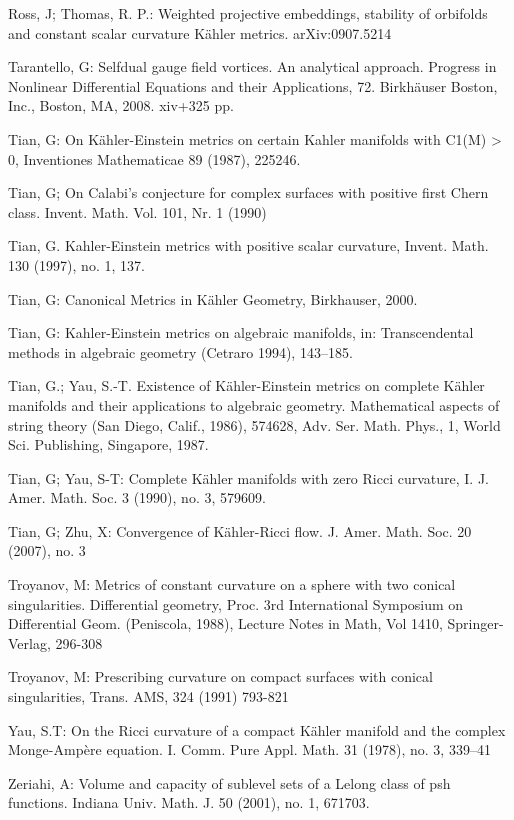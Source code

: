 \documentclass[11pt,oneside,english]{amsart}
\numberwithin{equation}{section}
\numberwithin{figure}{section}
\theoremstyle{plain}
\theoremstyle{plain}
\theoremstyle{plain}
\theoremstyle{plain}
\theoremstyle{remark}
\theoremstyle{definition}
\begin{document}
\begin{thebibliography}{10}
Ross, J; Thomas, R. P.: Weighted projective embeddings,
stability of orbifolds and constant scalar curvature Kähler metrics.
arXiv:0907.5214

Tarantello, G: Selfdual gauge field vortices. An analytical
approach. Progress in Nonlinear Differential Equations and their Applications,
72. Birkhäuser Boston, Inc., Boston, MA, 2008. xiv+325 pp.

Tian, G: On Kähler-Einstein metrics on certain K\textasciidieresis{}ahler
manifolds with C1(M) > 0, Inventiones Mathematicae 89 (1987), 225\textendash{}246.

Tian, G; On Calabi's conjecture for complex surfaces
with positive first Chern class. Invent. Math. Vol. 101, Nr. 1 (1990)

Tian, G. K\textasciidieresis{}ahler-Einstein metrics
with positive scalar curvature, Invent. Math. 130 (1997), no. 1, 1\textendash{}37.

Tian, G: Canonical Metrics in Kähler Geometry, Birkh\textasciidieresis{}auser,
2000.

Tian, G: Kahler-Einstein metrics on algebraic manifolds,
in: Transcendental methods in algebraic geometry (Cetraro 1994), 143--185.

Tian, G.; Yau, S.-T. Existence of Kähler-Einstein metrics
on complete Kähler manifolds and their applications to algebraic geometry.
Mathematical aspects of string theory (San Diego, Calif., 1986), 574\textendash{}628,
Adv. Ser. Math. Phys., 1, World Sci. Publishing, Singapore, 1987. 

Tian, G; Yau, S-T: Complete Kähler manifolds with
zero Ricci curvature, I. J. Amer. Math. Soc. 3 (1990), no. 3, 579\textendash{}609.

Tian, G; Zhu, X: Convergence of Kähler-Ricci flow. J.
Amer. Math. Soc. 20 (2007), no. 3

Troyanov, M: Metrics of constant curvature on a sphere
with two conical singularities. Differential geometry, Proc. 3rd International
Symposium on Differential Geom. (Peniscola, 1988), Lecture Notes in
Math, Vol 1410, Springer-Verlag, 296-308

Troyanov, M: Prescribing curvature on compact surfaces
with conical singularities, Trans. AMS, 324 (1991) 793-821

Yau, S.T: On the Ricci curvature of a compact Kähler manifold
and the complex Monge-Ampère equation. I. Comm. Pure Appl. Math. 31
(1978), no. 3, 339--41

Zeriahi, A: Volume and capacity of sublevel sets of a
Lelong class of psh functions. Indiana Univ. Math. J. 50 (2001), no.
1, 671\textendash{}703. \end{thebibliography}
\end{document}
